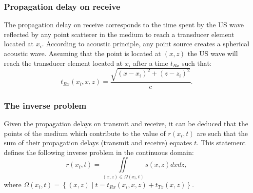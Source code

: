 \documentclass[conference]{IEEEtran}
\begin{document}
\subsubsection{Propagation delay on receive}
\label{subsubsec_receive_delay}
\par The propagation delay on receive corresponds to the time spent by the US wave reflected by any point scatterer in the medium to reach a transducer element located at $x_i$. According to acoustic principle, any point source creates a spherical acoustic wave. Assuming that the point is located at $\left(x, z\right)$ the US wave will reach the transducer element located at $x_i$ after a time $t_{Rx}$ such that:   
\begin{equation}
\label{eq_tau_bwd}
t_{Rx} \left( x_i, x, z \right) = \frac{\sqrt{\left( x - x_i\right)^2 + \left( z - z_i \right)^2}}{c}. 
\end{equation}
\subsubsection{The inverse problem}
\label{subsubsec:inverse_problem}
Given the propagation delays on transmit and receive, it can be deduced that the points of the medium which contribute to the value of $r\left(x_i, t\right)$  are such that the sum of their propagation delays (transmit and receive) equates $t$. This statement defines the following inverse problem in the continuous domain:
\begin{equation}
\label{eq_inv_problem_cont_domain}
r \left( x_i, t \right) = \iint \limits_{ \left( x, z \right) \in \Omega \left( x_i, t \right)} s \left( x, z \right) dx dz, 
\end{equation} 
where $\Omega \left(x_i, t \right) = \left\lbrace \left( x, z\right) \; | \; t = t_{Rx} \left( x_i, x, z \right) + t_{Tx} \left( x, z \right) \right\rbrace$.
\end{document}
